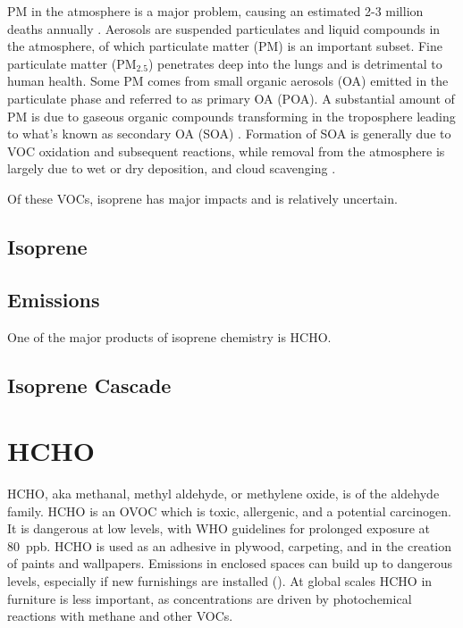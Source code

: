   PM in the atmosphere is a major problem, causing an estimated 2-3 million deaths annually \citep{Hoek2013, Krewski2009, Silva2013, Lelieveld2015}. 
  Aerosols are suspended particulates and liquid compounds in the atmosphere, of which particulate matter (PM) is an important subset.
  Fine particulate matter (PM$_{2.5}$) penetrates deep into the lungs and is detrimental to human health.
  Some PM comes from small organic aerosols (OA) emitted in the particulate phase and referred to as primary OA (POA).
  A substantial amount of PM is due to gaseous organic compounds transforming in the troposphere leading to what's known as secondary OA (SOA) \citep{Kroll2008}.
  Formation of SOA is generally due to VOC oxidation and subsequent reactions, while removal from the atmosphere is largely due to wet or dry deposition, and cloud scavenging \citep{Kanakidou2005}.
  
  Of these VOCs, isoprene has major impacts and is relatively uncertain.
  
  \subsection{Isoprene}
  \label{LR:VOCs:Isop}
    
    
  \subsection{Emissions}
  \label{LR:VOCs:Emissions}
    
  
    One of the major products of isoprene chemistry is HCHO.
    \subsection{Isoprene Cascade}
    \label{LR:VOCs:IsopCascade}
      
\section{HCHO}
\label{LR:HCHO}
  HCHO, aka methanal, methyl aldehyde, or methylene oxide, is of the aldehyde family.
  HCHO is an OVOC which is toxic, allergenic, and a potential carcinogen. 
  It is dangerous at low levels, with WHO guidelines for prolonged exposure at 80~ppb.
  HCHO is used as an adhesive in plywood, carpeting, and in the creation of paints and wallpapers.
  Emissions in enclosed spaces can build up to dangerous levels, especially if new furnishings are installed (\cite{Davenport2015}).
  At global scales HCHO in furniture is less important, as concentrations are driven by photochemical reactions with methane and other VOCs.
  
